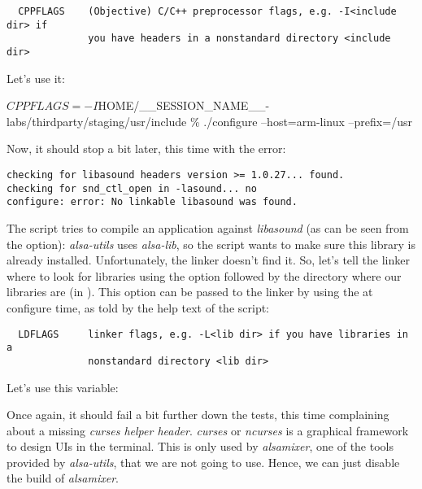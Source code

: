 \begin{verbatim}
  CPPFLAGS    (Objective) C/C++ preprocessor flags, e.g. -I<include dir> if
              you have headers in a nonstandard directory <include dir>
\end{verbatim}

Let's use it:

\begin{bashinput}
$ CPPFLAGS=-I$HOME/__SESSION_NAME__-labs/thirdparty/staging/usr/include \%\linebreak
./configure --host=arm-linux --prefix=/usr
\end{bashinput}

Now, it should stop a bit later, this time with the error:
\begin{verbatim}
checking for libasound headers version >= 1.0.27... found.
checking for snd_ctl_open in -lasound... no
configure: error: No linkable libasound was found.
\end{verbatim}

The  script tries to compile an application against {\em
  libasound} (as can be seen from the  option): {\em
  alsa-utils} uses {\em alsa-lib}, so the  script
wants to make sure this library is already installed. Unfortunately,
the  linker doesn't find it. So, let's tell the
linker where to look for libraries using the  option followed
by the directory where our libraries are (in
). This  option can be passed to the
linker by using the  at configure time, as told by the
help text of the  script:

\begin{verbatim}
  LDFLAGS     linker flags, e.g. -L<lib dir> if you have libraries in a
              nonstandard directory <lib dir>
\end{verbatim}

Let's use this  variable:


Once again, it should fail a bit further down the tests, this time
complaining about a missing {\em curses helper header}. {\em curses}
or {\em ncurses} is a graphical framework to design UIs in the
terminal. This is only used by {\em alsamixer}, one of the tools
provided by {\em alsa-utils}, that we are not going to use.
Hence, we can just disable the build of {\em alsamixer}.

